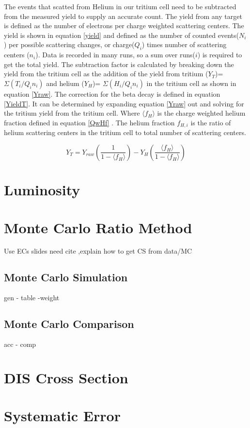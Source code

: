 The events that scatted from Helium in our tritium cell need to be subtracted from the measured yield to supply an accurate count. The yield from any target is defined as the number of electrons per charge weighted scattering centers. The yield is shown in equation \ref{yield} and defined as the number of counted events($N_i$) per possible scattering changes, or charge($Q_i$) times number of scattering centers ($n_i$). Data is recorded in many runs, so a sum over runs($i$) is required to get the total yield. The subtraction factor is calculated by breaking down the yield from the tritium cell as the addition of the yield from tritium ($Y_T$)= $\Sigma(T_i/Q_in_{i})$ and helium ($Y_H$)= $\Sigma(H_i/Q_in_{i})$ in the tritium cell as shown in equation \ref{Yraw}. The correction for the beta decay is defined in equation \ref{YieldT}. It can be determined by expanding equation \ref{Yraw} out and solving for the tritium yield from the tritium cell. Where $\langle f_H \rangle$ is the charge weighted helium fraction defined in equation \ref{QwHf} \cite{primer}. The helium fraction $f_{H,i}$ is the ratio of helium scattering centers in the tritium cell to total number of scattering centers. 

\begin{equation}
Y_T = Y_{raw}\left(\frac{1}{1-\langle f_H \rangle}\right) - Y_H \left(\frac{\langle f_H \rangle}{1-\langle f_H \rangle}\right) \label{YieldT}
\end{equation}

\section{Luminosity}

\section{Monte Carlo Ratio Method}
Use ECs slides need cite ,explain how to get CS from data/MC

\subsection{Monte Carlo Simulation}
gen - table -weight
\subsection{Monte Carlo Comparison}
acc - comp
\section{DIS Cross Section}

\section{Systematic Error}
\cite{Ar_Ti}




